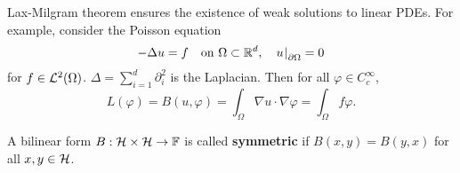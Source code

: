 \begin{remark}
    Lax-Milgram theorem ensures the existence of weak solutions to 
    linear PDEs. For example, consider the Poisson equation 
    \begin{equation*}
        -\Delta u = f \quad \text{on }\Omega\subset\mathbb{R}^d, \quad u\left.\hspace{-0.2em}\right|_{\partial\Omega} = 0
    \end{equation*}
    for $f\in\mathcal{L}^2(\Omega)$. $\Delta = \sum_{i=1}^{d}\partial_i^2$ is 
    the Laplacian. Then for all $\varphi\in C^\infty_c$, 
    \begin{equation*}
        L(\varphi) = B(u,\varphi) = \int_{\Omega} \nabla u\cdot\nabla\varphi = \int_{\Omega} f\varphi.
    \end{equation*} 
\end{remark}

\begin{definition}
    A bilinear form $B:\mathcal{H}\times\mathcal{H}\to\mathbb{F}$ is called \textbf{symmetric} 
    if $B(x,y) = B(y,x)$ for all $x,y\in\mathcal{H}$.
\end{definition}

